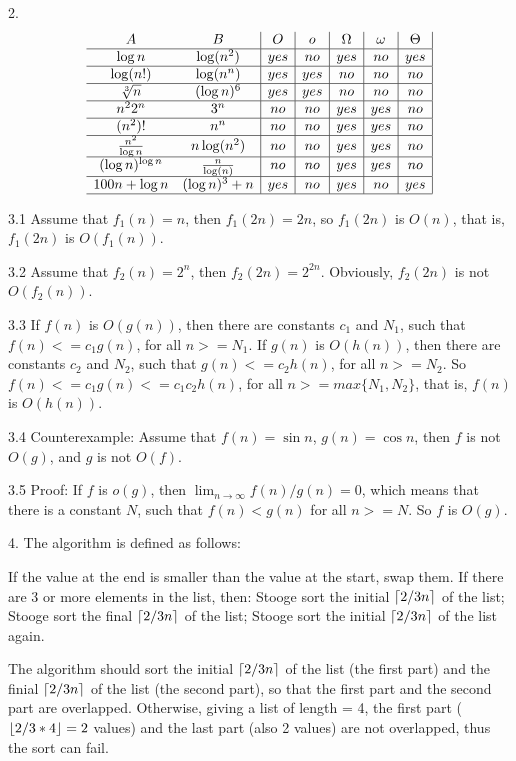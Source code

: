\documentclass[11pt]{article}
\DeclarePairedDelimiter\ceil{\lceil}{\rceil}
\DeclarePairedDelimiter\floor{\lfloor}{\rfloor}
\begin{document}
2.
$$
\begin{array}{cc|c|c|c|c|c|}
A & B & O & o & \Omega & \omega & \Theta \\ \hline
\log{n} & \log(n^2) & yes & no & yes & no & yes \\ \hline
\log (n!) & \log(n^n) & yes & yes & no & no & no \\ \hline
\sqrt[3]{n} & (\log n)^{6} & yes & yes & no & no & no \\ \hline
n^22^n & 3^n & no & no & yes & yes & no \\ \hline
(n^2)! & n^n & no & no & yes & yes & no \\ \hline
{n^2 \over \log{n}} & n \log(n^2) & no & no & yes & yes & no \\ \hline
(\log n)^{\log n} & {n \over \log(n)} & no & no & yes & yes & no \\ \hline
100n + \log n & (\log n)^{3} + n & yes & no & yes & no & yes \\ \hline
\end{array}
$$

3.1 Assume that $f_1(n)=n$, then $f_1(2n)=2n$, so $f_1(2n)$ is $O(n)$, that is, $f_1(2n)$ is $O(f_1(n))$.

3.2 Assume that $f_2(n)=2^n$, then $f_2(2n)=2^{2n}$. Obviously, $f_2(2n)$ is not $O(f_2(n))$.

3.3 If $f(n)$ is $O(g(n))$, then there are constants $c_1$ and $N_1$, such that $f(n)<=c_1g(n)$, for all $n>=N_1$.
	 If $g(n)$ is $O(h(n))$, then there are constants $c_2$ and $N_2$, such that $g(n)<=c_2h(n)$, for all $n>=N_2$. 
	So $f(n)<=c_1g(n)<=c_1 c_2 h(n)$, for all $n>=max\{N_1, N_2\}$, that is, $f(n)$ is $O(h(n))$.
	
3.4 Counterexample: Assume that $f(n)=\sin{n}$, $g(n)=\cos{n}$, then $f$ is not $O(g)$, and $g$ is not $O(f)$.

3.5 Proof: If $f$ is $o(g)$, then $\lim_{n\to\infty} f(n)/g(n)=0$, which means that there is a constant $N$, such that $f(n)<g(n)$ for all $n>=N$. So $f$ is $O(g)$.

4. The algorithm is defined as follows:

If the value at the end is smaller than the value at the start, swap them.
If there are 3 or more elements in the list, then:
Stooge sort the initial $\ceil{2/3 n}$ of the list;
Stooge sort the final $\ceil{2/3 n}$ of the list;
Stooge sort the initial $\ceil{2/3 n}$ of the list again.

The algorithm should sort the initial $\ceil{2/3 n}$ of the list (the first part) and the finial $\ceil{2/3 n}$ of the list (the second part), so that the first part and the second part are overlapped. Otherwise, giving a list of length = 4,  the first part ($\floor{2/3*4} = 2$ values) and the last part (also 2 values) are not overlapped, thus the sort can fail.
\end{document}
